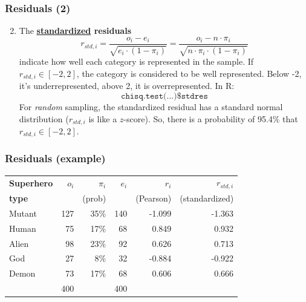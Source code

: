 \documentclass{beamer}
\begin{document}
\begin{frame}
\frametitle{Residuals (2)}

\begin{enumerate}
\setcounter{enumi}{1}
\item The \textbf{\underline{standardized} residuals}
\[ r_{std,i} = \frac{o_i-e_i}{\sqrt{e_i \cdot (1-\pi_i)}} = \frac{o_i - n \cdot \pi_i}{\sqrt{n \cdot \pi_i \cdot (1-\pi_i)}}\]
indicate how well each category is represented in the sample.
\vfill
If $r_{std,i} \in [-2,2]$, the category is considered to be well represented.
Below -2, it's underrepresented, above 2, it is overrepresented.
\vfill
    In R:
    \[ \texttt{chisq.test(...)\$stdres} \]
\vfill
\scriptsize For \textit{random} sampling, the standardized residual has a standard normal distribution ($r_{std,i}$ is like a $z$-score).
So, there is a probability of 95.4\% that $r_{std,i} \in [-2,2]$.

\end{enumerate}
\end{frame}

\begin{frame}
\frametitle{Residuals (example)}

\begin{table}[h]
    \begin{tabular}{@{}lrrrrr@{}}
        \toprule
\textbf{Superhero} & $o_i$ & $\pi_i$ & $e_i$ & $r_i$ & $r_{std,i}$ \\
\textbf{type}      & & \scriptsize{(prob)} & & \scriptsize{(Pearson)} & \scriptsize{(standardized)} \\ \midrule
        Mutant & 127   & 35\%           & 140          & -1.099 & -1.363 \\
        Human  & 75    & 17\%           & 68           & 0.849  & 0.932 \\
        Alien  & 98    & 23\%           & 92           & 0.626  & 0.713 \\
        God    & 27    & 8\%            & 32           & -0.884 & -0.922 \\
        Demon  & 73    & 17\%           & 68           & 0.606  & 0.666 \\ \bottomrule
        & 400 & & 400 & & \\
    \end{tabular}
\end{table}

\end{frame}
\end{document}
